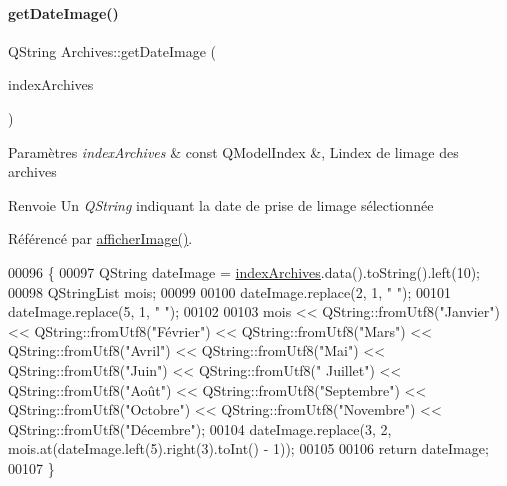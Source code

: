\paragraph{\texorpdfstring{get\+Date\+Image()}{getDateImage()}}
{\footnotesize\ttfamily Q\+String Archives\+::get\+Date\+Image (\begin{DoxyParamCaption}\item[{const Q\+Model\+Index \&}]{index\+Archives }\end{DoxyParamCaption})}


\begin{DoxyParams}{Paramètres}
{\em index\+Archives} & const Q\+Model\+Index \&, L\textquotesingle{}index de l\textquotesingle{}image des archives \\
\hline
\end{DoxyParams}
\begin{DoxyReturn}{Renvoie}
Un {\itshape Q\+String} indiquant la date de prise de l\textquotesingle{}image sélectionnée 
\end{DoxyReturn}


Référencé par \hyperlink{class_archives_a0e12a12774643d96831be4daba73976e}{afficher\+Image()}.


\begin{DoxyCode}
00096 \{
00097     QString dateImage = \hyperlink{class_archives_a31cba52f3979585ee5e2b9390d21322b}{indexArchives}.data().toString().left(10);
00098     QStringList mois;
00099 
00100     dateImage.replace(2, 1, \textcolor{stringliteral}{" "});
00101     dateImage.replace(5, 1, \textcolor{stringliteral}{" "});
00102 
00103     mois << QString::fromUtf8(\textcolor{stringliteral}{"Janvier"}) << QString::fromUtf8(\textcolor{stringliteral}{"Février"}) << QString::fromUtf8(\textcolor{stringliteral}{"Mars"}) << 
      QString::fromUtf8(\textcolor{stringliteral}{"Avril"}) << QString::fromUtf8(\textcolor{stringliteral}{"Mai"}) << QString::fromUtf8(\textcolor{stringliteral}{"Juin"}) << QString::fromUtf8(\textcolor{stringliteral}{"
      Juillet"}) << QString::fromUtf8(\textcolor{stringliteral}{"Août"}) << QString::fromUtf8(\textcolor{stringliteral}{"Septembre"}) << QString::fromUtf8(\textcolor{stringliteral}{"Octobre"}) << 
      QString::fromUtf8(\textcolor{stringliteral}{"Novembre"}) << QString::fromUtf8(\textcolor{stringliteral}{"Décembre"});
00104     dateImage.replace(3, 2, mois.at(dateImage.left(5).right(3).toInt() - 1));
00105 
00106     \textcolor{keywordflow}{return} dateImage;
00107 \}
\end{DoxyCode}
\mbox{\label{class_archives_a91604a37aa9d4024ed79a71b12438003}} 
